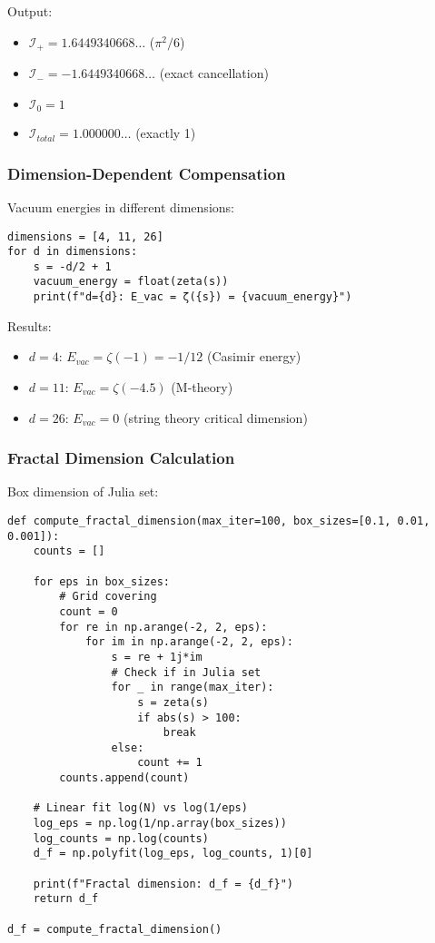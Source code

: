 \documentclass[11pt]{article}
\theoremstyle{plain}
\theoremstyle{definition}
\theoremstyle{remark}
\begin{document}
Output:
\begin{itemize}
\item $\mathcal{I}_+ = 1.6449340668\ldots$ ($\pi^2/6$)
\item $\mathcal{I}_- = -1.6449340668\ldots$ (exact cancellation)
\item $\mathcal{I}_0 = 1$
\item $\mathcal{I}_{total} = 1.000000\ldots$ (exactly 1)
\end{itemize}

\subsubsection{Dimension-Dependent Compensation}

Vacuum energies in different dimensions:

\begin{lstlisting}
dimensions = [4, 11, 26]
for d in dimensions:
    s = -d/2 + 1
    vacuum_energy = float(zeta(s))
    print(f"d={d}: E_vac = ζ({s}) = {vacuum_energy}")
\end{lstlisting}

Results:
\begin{itemize}
\item $d=4$: $E_{vac} = \zeta(-1) = -1/12$ (Casimir energy)
\item $d=11$: $E_{vac} = \zeta(-4.5)$ (M-theory)
\item $d=26$: $E_{vac} = 0$ (string theory critical dimension)
\end{itemize}

\subsubsection{Fractal Dimension Calculation}

Box dimension of Julia set:

\begin{lstlisting}
def compute_fractal_dimension(max_iter=100, box_sizes=[0.1, 0.01, 0.001]):
    counts = []

    for eps in box_sizes:
        # Grid covering
        count = 0
        for re in np.arange(-2, 2, eps):
            for im in np.arange(-2, 2, eps):
                s = re + 1j*im
                # Check if in Julia set
                for _ in range(max_iter):
                    s = zeta(s)
                    if abs(s) > 100:
                        break
                else:
                    count += 1
        counts.append(count)

    # Linear fit log(N) vs log(1/eps)
    log_eps = np.log(1/np.array(box_sizes))
    log_counts = np.log(counts)
    d_f = np.polyfit(log_eps, log_counts, 1)[0]

    print(f"Fractal dimension: d_f = {d_f}")
    return d_f

d_f = compute_fractal_dimension()
\end{lstlisting}
\end{document}
